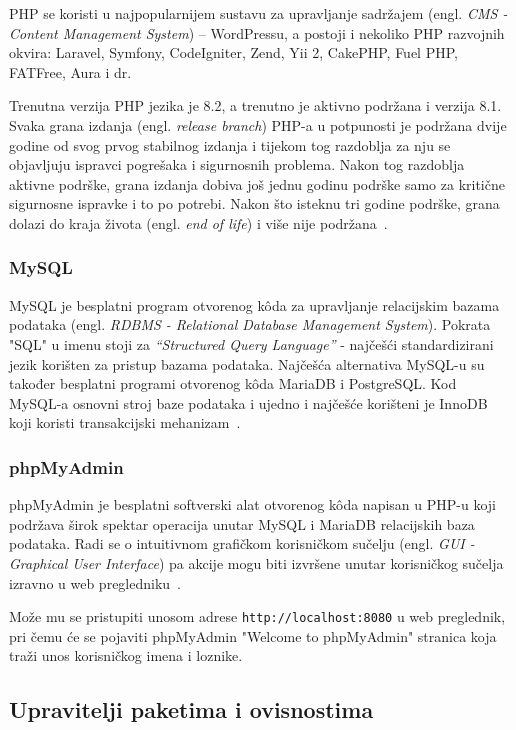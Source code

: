 PHP se koristi u najpopularnijem sustavu za upravljanje
sadržajem (engl. \textit{CMS - Content Management System}) – WordPressu, a postoji i nekoliko PHP razvojnih okvira: Laravel, Symfony, CodeIgniter, Zend, Yii 2, CakePHP, Fuel PHP, FATFree, Aura i dr.~\cite{Brekalo}

Trenutna verzija PHP jezika je 8.2, a trenutno je aktivno podržana i verzija 8.1. Svaka grana izdanja (engl. \textit{release branch}) PHP-a u potpunosti je podržana dvije godine od svog prvog stabilnog izdanja i tijekom tog razdoblja za nju se objavljuju ispravci pogrešaka i sigurnosnih problema. Nakon tog razdoblja aktivne podrške, grana izdanja dobiva još jednu godinu podrške samo za kritične sigurnosne ispravke i to po potrebi. Nakon što isteknu tri godine podrške, grana dolazi do kraja života (engl. \textit{end of life}) i više nije podržana~\cite{phpVersions}.

\subsubsection{MySQL}
MySQL je besplatni program otvorenog k\^oda za upravljanje relacijskim bazama podataka (engl. \textit{RDBMS - Relational Database Management System}). Pokrata "SQL" u imenu stoji za \textit{“Structured Query Language”} - najčešći standardizirani jezik korišten za pristup bazama podataka. Najčešća alternativa MySQL-u su također besplatni programi otvorenog k\^oda MariaDB i PostgreSQL. Kod MySQL-a osnovni stroj baze podataka i ujedno i najčešće korišteni je InnoDB koji koristi transakcijski mehanizam~\cite{Brekalo}.

\subsubsection{phpMyAdmin}
phpMyAdmin je besplatni softverski alat otvorenog k\^oda napisan u PHP-u koji podržava širok spektar operacija unutar MySQL i MariaDB relacijskih baza podataka. Radi se o intuitivnom grafičkom korisničkom sučelju (engl. \textit{GUI - Graphical User Interface}) pa akcije mogu biti izvršene unutar korisničkog sučelja izravno u web pregledniku~\cite{Brekalo}.

Može mu se pristupiti unosom adrese \texttt{http://localhost:8080} u web preglednik, pri čemu će se pojaviti phpMyAdmin "Welcome to phpMyAdmin" stranica koja traži unos korisničkog imena i loznike.

\subsection{Upravitelji paketima i ovisnostima}

